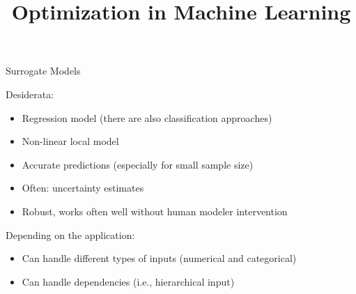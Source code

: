 \documentclass[11pt,compress,t,notes=noshow, xcolor=table]{beamer}
\title{Optimization in Machine Learning}
\date{}
\begin{document}

\begin{frame}{Surrogate Models}

Desiderata:

\begin{itemize}
  \item Regression model (there are also classification approaches)
  \item Non-linear local model
  \item Accurate predictions (especially for small sample size)
  \item Often: uncertainty estimates
  \item Robust, works often well without human modeler intervention
\end{itemize}

\vspace{+0.45cm}

Depending on the application:

\begin{itemize}
  \item Can handle different types of inputs (numerical and categorical)
  \item Can handle dependencies (i.e., hierarchical input)
\end{itemize}

\end{frame}
\end{document}

